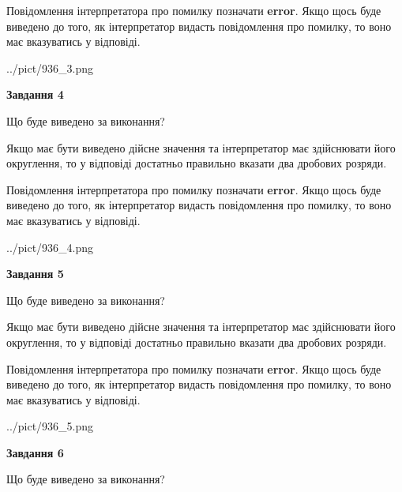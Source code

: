 \documentclass[12pt, ukrainian]{article}
\begin{document}
{\begin {Large}
Повідомлення інтерпретатора про помилку позначати \textbf{error}.
Якщо щось буде виведено до того, як інтерпретатор видасть повідомлення про помилку, 
то воно має вказуватись у відповіді. \par

\begin{center}
	{../pict/936_3.png}
\end{center}
\newpage

{\begin {center}\textbf{Завдання 4}\end {center}}\par
Що буде виведено за виконання? \par

Якщо має бути виведено дійсне значення та інтерпретатор має здійснювати його округлення, 
то у відповіді достатньо правильно вказати два дробових розряди.

Повідомлення інтерпретатора про помилку позначати \textbf{error}.
Якщо щось буде виведено до того, як інтерпретатор видасть повідомлення про помилку, 
то воно має вказуватись у відповіді. \par

\begin{center}
	{../pict/936_4.png}
\end{center}
\newpage

{\begin {center}\textbf{Завдання 5}\end {center}}\par
Що буде виведено за виконання? \par

Якщо має бути виведено дійсне значення та інтерпретатор має здійснювати його округлення, 
то у відповіді достатньо правильно вказати два дробових розряди.

Повідомлення інтерпретатора про помилку позначати \textbf{error}.
Якщо щось буде виведено до того, як інтерпретатор видасть повідомлення про помилку, 
то воно має вказуватись у відповіді. \par

\begin{center}
	{../pict/936_5.png}
\end{center}
\newpage

{\begin {center}\textbf{Завдання 6}\end {center}}\par
Що буде виведено за виконання? \par


\end{Large}}
\end{document}
